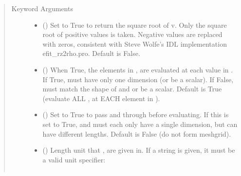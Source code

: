 \documentclass[letterpaper,10pt,english]{sphinxmanual}
\begin{document}
\begin{fulllineitems}
\begin{fulllineitems}
\begin{quote}
\begin{description}
\item[{Keyword Arguments}] \leavevmode\begin{itemize}
\item {} 
 () \textendash{} Set to True to return the square root of v.
Only the square root of positive values is taken. Negative
values are replaced with zeros, consistent with Steve Wolfe’s
IDL implementation efit\_rz2rho.pro. Default is False.

\item {} 
 () \textendash{} When True, the elements in ,  are evaluated
at each value in . If True,  must have only one dimension
(or be a scalar). If False,  must match the shape of  and
 or be a scalar. Default is True (evaluate ALL ,  at
EACH element in ).

\item {} 
 () \textendash{} Set to True to pass  and  through
 before evaluating. If this is set to
True,  and  must each only have a single dimension, but
can have different lengths. Default is False (do not form
meshgrid).

\item {} 
 () \textendash{} 
Length unit that ,  are given in.
If a string is given, it must be a valid unit specifier:
\begin{quote}


\begin{savenotes}\sphinxattablestart
\centering
\begin{tabulary}{\linewidth}[t]{|T|T|}
\hline


\end{tabulary}
\end{savenotes}
\end{quote}
\end{itemize}
\end{description}
\end{quote}
\end{fulllineitems}
\end{fulllineitems}
\end{document}
